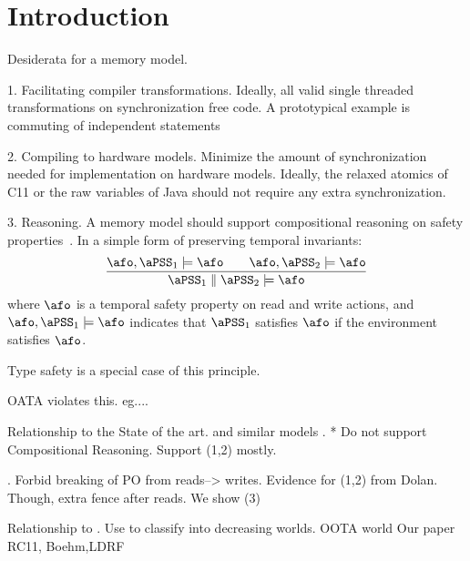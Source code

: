 \section{Introduction}

Desiderata for a memory model.

1. Facilitating compiler transformations.   Ideally, all valid single threaded transformations on synchronization free code.  A prototypical example is commuting of independent statements

2. Compiling to hardware models.  Minimize the amount of synchronization needed for implementation on hardware models.  Ideally, the relaxed atomics of C11 or the raw variables of Java should not require any extra synchronization.

3. Reasoning.  A memory model should support compositional reasoning on safety properties~\cite{PnueliSafety,Misra:1981:PNP:1313338.1313770,StarkSafety,Abadi:1993:CS:151646.151649}.  In a simple form of preserving temporal invariants:
\[
  \frac{
      \afo, \aPSS_1 \models\afo
      \qquad
      \afo, \aPSS_2 \models\afo
    }{\aPSS_1 \parallel \aPSS_2 \models \afo}
\]
where $\afo$ is a temporal safety property on read and write actions, and $\afo, \aPSS_1 \models\afo$ indicates that $\aPSS_1$ satisfies $\afo$ if the environment satisfies $\afo$.

Type safety is a special case of this principle. 

OATA violates this. eg....

Relationship to the State of the art.
\citet{Manson:2005:JMM:1047659.1040336} and similar models
  \cite{DBLP:conf/esop/JagadeesanPR10,DBLP:conf/popl/KangHLVD17} 
 \citet{DBLP:conf/lics/JeffreyR16}.
       * Do not support Compositional Reasoning.  
          Support (1,2) mostly.

\citet{RC11refs,Dolan:2018:BDR:3192366.3192421}. 
           Forbid breaking of PO from reads--> writes.  
           Evidence for (1,2) from Dolan.  Though, extra fence after reads.
           We show (3)

Relationship to \citet{BoehmOOTA}.
   Use to classify into decreasing worlds.
           OOTA world
              Our paper
                 RC11, Boehm,LDRF


